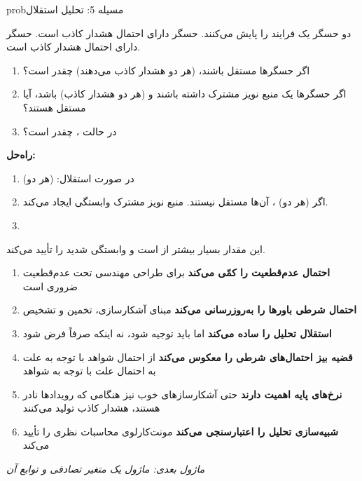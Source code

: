 \begin{PSbox}[unbreakable]{prob}{مسیله 5: تحلیل استقلال}

دو حسگر یک فرایند را پایش می‌کنند. حسگر  دارای احتمال هشدار کاذب  است. حسگر  دارای احتمال هشدار کاذب  است.

\begin{enumerate}
\def\labelenumi{(\alph{enumi})}
\tightlist
\item
  اگر حسگرها مستقل باشند، (هر دو هشدار کاذب می‌دهند) چقدر است؟
\item
  اگر حسگرها یک منبع نویز مشترک داشته باشند و (هر دو هشدار کاذب)  باشد، آیا مستقل هستند؟
\item
  در حالت ،  چقدر است؟
\end{enumerate}

\textbf{راه‌حل:}

\begin{enumerate}
\def\labelenumi{(\alph{enumi})}
\item
  در صورت استقلال: (هر دو) 
\item
  اگر (هر دو) ، آن‌ها مستقل نیستند. منبع نویز مشترک وابستگی ایجاد می‌کند.
\item
\end{enumerate}

این مقدار بسیار بیشتر از  است و وابستگی شدید را تأیید می‌کند.

\end{PSbox}


\begin{enumerate}
\def\labelenumi{\arabic{enumi}.}
\tightlist
\item
  \textbf{احتمال عدم‌قطعیت را کمّی می‌کند}  برای طراحی مهندسی تحت عدم‌قطعیت ضروری است
\item
  \textbf{احتمال شرطی باورها را به‌روزرسانی می‌کند}  مبنای آشکارسازی، تخمین و تشخیص
\item
  \textbf{استقلال تحلیل را ساده می‌کند}  اما باید توجیه شود، نه اینکه صرفاً فرض شود
\item
  \textbf{قضیه بیز احتمال‌های شرطی را معکوس می‌کند}  از احتمال شواهد با توجه به علت به احتمال علت با توجه به شواهد
\item
  \textbf{نرخ‌های پایه اهمیت دارند}  حتی آشکارسازهای خوب نیز هنگامی که رویدادها نادر هستند، هشدار کاذب تولید می‌کنند
\item
  \textbf{شبیه‌سازی تحلیل را اعتبارسنجی می‌کند}  مونت‌کارلوی  محاسبات نظری را تأیید می‌کند
\end{enumerate}

\emph{ماژول بعدی: {ماژول  یک متغیر تصادفی و توابع آن}}\PSbr{}
